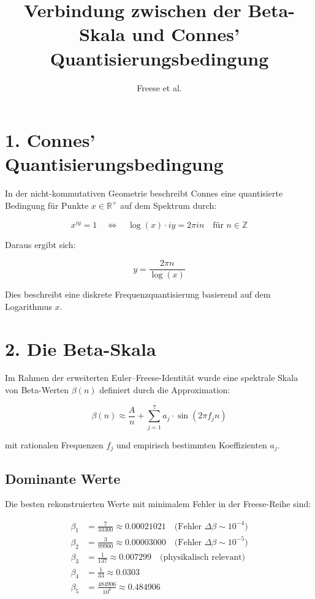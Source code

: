 \documentclass[12pt]{article}
\title{Verbindung zwischen der Beta-Skala und Connes' Quantisierungsbedingung}
\author{Freese et al.}
\date{}
\begin{document}
\maketitle

\section*{1. Connes’ Quantisierungsbedingung}

In der nicht-kommutativen Geometrie beschreibt Connes eine quantisierte Bedingung für Punkte $x \in \mathbb{R}^+$ auf dem Spektrum durch:

\[
x^{iy} = 1
\quad \Leftrightarrow \quad 
\log(x) \cdot iy = 2\pi i n \quad \text{für } n \in \mathbb{Z}
\]

Daraus ergibt sich:

\[
y = \frac{2\pi n}{\log(x)}
\]

Dies beschreibt eine diskrete Frequenzquantisierung basierend auf dem Logarithmus $x$.

\section*{2. Die Beta-Skala}

Im Rahmen der erweiterten Euler–Freese-Identität wurde eine spektrale Skala von Beta-Werten $\beta(n)$ definiert durch die Approximation:

\[
\beta(n) \approx \frac{A}{n} + \sum_{j=1}^{7} a_j \cdot \sin(2\pi f_j n)
\]

mit rationalen Frequenzen $f_j$ und empirisch bestimmten Koeffizienten $a_j$.

\subsection*{Dominante Werte}

Die besten rekonstruierten Werte mit minimalem Fehler in der Freese-Reihe sind:

\begin{align*}
\beta_1 &= \frac{7}{33300} \approx 0.00021021 \quad \text{(Fehler $\Delta \beta \sim 10^{-4}$)} \\
\beta_2 &= \frac{3}{99900} \approx 0.00003000 \quad \text{(Fehler $\Delta \beta \sim 10^{-5}$)} \\
\beta_3 &= \frac{1}{137} \approx 0.007299 \quad \text{(physikalisch relevant)} \\
\beta_4 &= \frac{1}{33} \approx 0.0303 \\
\beta_5 &= \frac{484906}{10^6} \approx 0.484906 \\
\end{align*}
\end{document}

